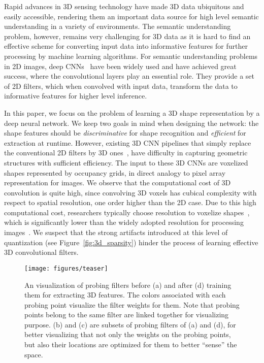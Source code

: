 \documentclass{article}
\begin{document}
Rapid advances in 3D sensing technology have made 3D data ubiquitous and easily accessible, rendering them an important data source for high level semantic understanding in a variety of environments. The semantic understanding problem, however, remains very challenging for 3D data as it is hard to find an effective scheme for converting input data into informative features for further processing by machine learning algorithms. For semantic understanding problems in 2D images, deep CNNs~\cite{Lecun_IEEE98_Gradient} have been widely used and have achieved great success, where the convolutional layers play an essential role. They provide a set of 2D filters, which when convolved with input data, transform the data to informative features for higher level inference.


In this paper, we focus on the problem of learning a 3D shape representation by a deep neural network. We keep two goals in mind when designing the network: the shape features should be \emph{discriminative} for shape recognition and \emph{efficient} for extraction at runtime. However, existing 3D CNN pipelines that simply replace the conventional 2D filters by 3D ones~\cite{WU_CVPR15_3D,Maturana_IROS15_VoxNet}, have difficulty in capturing geometric structures with sufficient efficiency. The input to these 3D CNNs are voxelized shapes represented by occupancy grids, in direct analogy to pixel array representation for images. We observe that the computational cost of 3D convolution is quite high, since convolving 3D voxels has cubical complexity with respect to spatial resolution, one order higher than the 2D case. Due to this high computational cost, researchers typically choose  resolution to voxelize shapes~\cite{WU_CVPR15_3D,Maturana_IROS15_VoxNet}, which is significantly lower than the widely adopted resolution  for processing images~\cite{Russakovsky_IJCV15_ImageNet}. We suspect that the strong artifacts introduced at this level of quantization (see Figure~\ref{fig:3d_sparsity}) hinder the process of learning effective 3D convolutional filters.

\begin{figure}[t!]
	\vspace{-0.5cm}
	\begin{center}
		\texttt{[image: figures/teaser]}
	\end{center}
	\vspace{-0.3cm}
	\caption{An visualization of probing filters before (a) and after (d) training them for extracting 3D features. The colors associated with each probing point visualize the filter weights for them. Note that probing points belong to the same filter are linked together for visualizing purpose. (b) and (c) are subsets of probing filters of (a) and (d), for better visualizing that not only the weights on the probing points, but also their locations are optimized for them to better ``sense'' the space.}
	\label{fig:teaser}
	\vspace{-0.6cm}
\end{figure}
\end{document}
